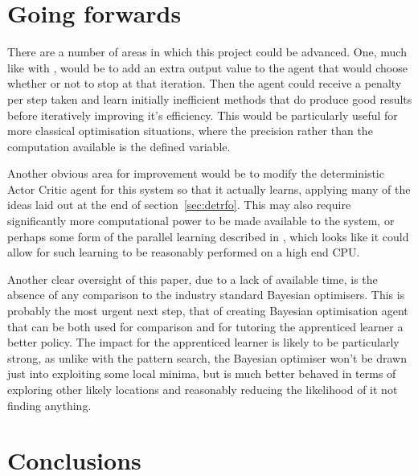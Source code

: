\section{Going forwards}
There are a number of areas in which this project could be advanced. One, much like with \cite{RVA}, would be to add an extra output value to the agent that would choose whether or not to stop at that iteration. Then the agent could receive a penalty per step taken and learn initially inefficient methods that do produce good results before iteratively improving it's efficiency. This would be particularly useful for more classical optimisation situations, where the precision rather than the computation available is the defined variable.

Another obvious area for improvement would be to modify the deterministic Actor Critic agent for this system so that it actually learns, applying many of the ideas laid out at the end of section~\ref{sec:detrfo}. This may also require significantly more computational power to be made available to the system, or perhaps some form of the parallel learning described in \cite{mnih2016asynchronous}, which looks like it could allow for such learning to be reasonably performed on a high end CPU.

Another clear oversight of this paper, due to a lack of available time, is the absence of any comparison to the industry standard Bayesian optimisers. This is probably the most urgent next step, that of creating Bayesian optimisation agent that can be both used for comparison and for tutoring the apprenticed learner a better policy. The impact for the apprenticed learner is likely to be particularly strong, as unlike with the pattern search, the Bayesian optimiser won't be drawn just into exploiting some local minima, but is much better behaved in terms of exploring other likely locations and reasonably reducing the likelihood of it not finding anything.


\section{Conclusions}